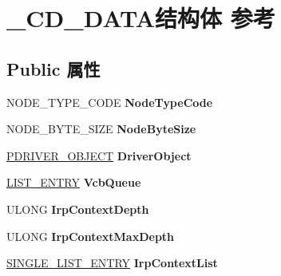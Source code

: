 \hypertarget{struct___c_d___d_a_t_a}{}\section{\+\_\+\+C\+D\+\_\+\+D\+A\+T\+A结构体 参考}
\label{struct___c_d___d_a_t_a}
\subsection*{Public 属性}
\begin{DoxyCompactItemize}
\item 
\mbox{\label{struct___c_d___d_a_t_a_a45baff5b8c5a241e4326c7386755e7fc}} 
N\+O\+D\+E\+\_\+\+T\+Y\+P\+E\+\_\+\+C\+O\+DE {\bfseries Node\+Type\+Code}
\item 
\mbox{\label{struct___c_d___d_a_t_a_a23b671de551a886817d39f2fa7925e55}} 
N\+O\+D\+E\+\_\+\+B\+Y\+T\+E\+\_\+\+S\+I\+ZE {\bfseries Node\+Byte\+Size}
\item 
\mbox{\label{struct___c_d___d_a_t_a_ab3d2f0712e5b0528e897d19ce5139c51}} 
\hyperlink{struct___d_r_i_v_e_r___o_b_j_e_c_t}{P\+D\+R\+I\+V\+E\+R\+\_\+\+O\+B\+J\+E\+CT} {\bfseries Driver\+Object}
\item 
\mbox{\label{struct___c_d___d_a_t_a_a273302b126dc8d08b228bca1a5c5cdf3}} 
\hyperlink{struct___l_i_s_t___e_n_t_r_y}{L\+I\+S\+T\+\_\+\+E\+N\+T\+RY} {\bfseries Vcb\+Queue}
\item 
\mbox{\label{struct___c_d___d_a_t_a_a171215217cd7366687880676a23fcf43}} 
U\+L\+O\+NG {\bfseries Irp\+Context\+Depth}
\item 
\mbox{\label{struct___c_d___d_a_t_a_a9df414a7f53747cce733f7aa758229ab}} 
U\+L\+O\+NG {\bfseries Irp\+Context\+Max\+Depth}
\item 
\mbox{\label{struct___c_d___d_a_t_a_ab2d7f7728d4ec3991643381827470612}} 
\hyperlink{struct___s_i_n_g_l_e___l_i_s_t___e_n_t_r_y}{S\+I\+N\+G\+L\+E\+\_\+\+L\+I\+S\+T\+\_\+\+E\+N\+T\+RY} {\bfseries Irp\+Context\+List}
\item 
\mbox{\label{struct___c_d___d_a_t_a_ab87e2113f594eeb924d0fc87bbaad275}} 

\end{DoxyCompactItemize}
